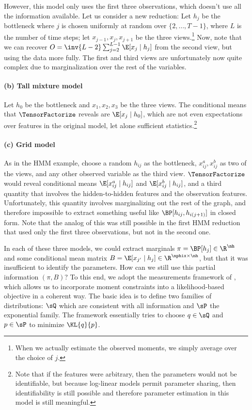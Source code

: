 However, this model only uses the first three observations,
which doesn't use all the information available.
Let us consider a new reduction:
Let $h_j$ be the bottleneck where $j$ is chosen uniformly at random over $\{2,
\dots, T-1\}$, where $L$ is the number of time steps; let $x_{j-1},x_j,x_{j+1}$ be the three views.\footnote{
When we actually estimate the observed moments, we simply average over the choice of $j$.}
Now, note that we can recover $O = \inv{L-2} \sum_{j=2}^{L-1} \E[x_j \mid h_j]$ from the second view,
but using the data more fully.  The first and third views are unfortunately now
quite complex due to marginalization over the rest of the variables.

\paragraph{(b) Tall mixture model}
Let $h_0$ be the bottleneck and $x_1,x_2,x_3$ be the three
views.  The conditional means that $\TensorFactorize$ reveals are $\E[x_j \mid h_0]$, which are not even
expectations over features in the original model, let alone sufficient
statistics.\footnote{Note that if the features were arbitrary, then the
parameters would not be identifiable, but because log-linear models permit
parameter sharing, then identifiability is still possible and therefore
parameter estimation in this model is still meaningful.}

\paragraph{(c) Grid model}
As in the HMM example, choose a random $h_{ij}$ as the bottleneck,
$x_{ij}^a,x_{ij}^b$ as two of the views, and any other observed variable as the third view.
$\TensorFactorize$ would reveal conditional means $\E[x_{ij}^a \mid h_{ij}]$ and $\E[x_{ij}^b \mid h_{ij}]$,
and a third quantity that involves the hidden-to-hidden features and the observation features.
Unfortunately, this quantity involves marginalizing out the rest of the graph,
and therefore impossible to extract something useful like $\BP[h_{ij}, h_{i(j+1)}]$
in closed form.
Note that the analog of this was still possible in the first HMM reduction that used only the first three observations,
but not in the second one.

In each of these three models, we could extract marginals $\pi = \BP[h_j] \in \R^{\nh}$
and some conditional mean matrix $B = \E[x_{j'} \mid h_j] \in \R^{\nphix \times \nh}$,
but that it was insufficient to identify the parameters.  How can we still use this partial information $(\pi,B)$?
To this end, we adopt the measurements framework of \citet{liang09measurements},
which allows us to incorporate moment constraints into a likelihood-based objective in a coherent way.
The basic idea is to define two families of distributions: $\sQ$ which are
consistent with all information and $\sP$ the exponential family.  The
framework essentially tries to choose $q \in \sQ$ and $p \in \sP$ to minimize
$\KL{q}{p}$.

